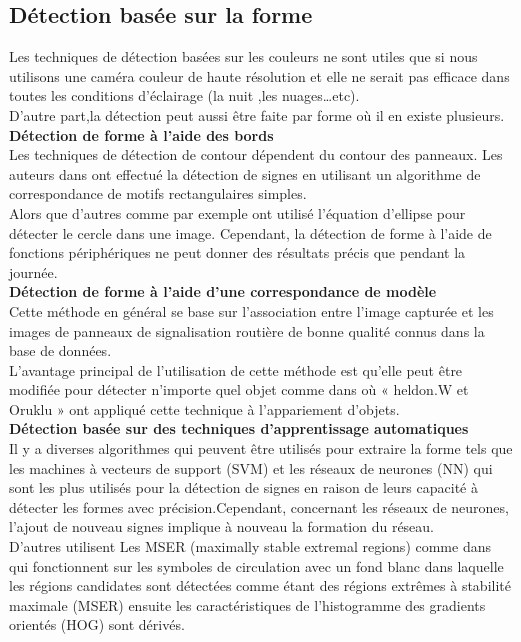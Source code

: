 \subsection{ Détection basée sur la forme}

Les techniques de détection basées sur les couleurs ne sont utiles que si nous utilisons une caméra couleur de haute résolution et elle ne serait pas efficace dans toutes les conditions d’éclairage (la nuit ,les nuages…etc).\\
D’autre part,la détection peut aussi être faite par forme où il en existe plusieurs.\\

{\textbf{Détection de forme à l'aide des bords }}\\

Les techniques de détection de contour dépendent du contour des panneaux. Les auteurs dans \cite{19} ont effectué la détection de signes en utilisant un algorithme de correspondance de motifs rectangulaires simples.\\ 
Alors que d’autres comme par exemple \cite{20} ont utilisé l'équation d'ellipse pour détecter le cercle dans une image.
Cependant, la détection de forme à l'aide de fonctions périphériques ne peut donner des résultats précis que pendant la journée.\\

{\textbf{Détection de forme à l'aide d'une correspondance de modèle}}\\

Cette  méthode en général se base sur l’association entre l'image capturée et les  images de panneaux de signalisation routière de bonne qualité connus dans la base de données.\\ 
L’avantage principal de l’utilisation de cette méthode est qu’elle peut être modifiée pour détecter n’importe quel objet comme dans \cite{21} où « heldon.W et Oruklu » ont appliqué cette technique à l'appariement d'objets.\\

{\textbf{Détection basée sur des techniques d'apprentissage automatiques}}\\

Il y a diverses algorithmes qui peuvent être utilisés pour extraire la forme tels que les machines à vecteurs de support (SVM) et les réseaux de neurones (NN) qui sont les plus utilisés pour la détection de signes en raison de leurs capacité à détecter les formes avec précision.Cependant, concernant les réseaux de neurones, l’ajout de nouveau signes implique à nouveau la formation du réseau.\\ 
D’autres utilisent Les MSER (maximally stable extremal regions) comme dans \cite{21} qui fonctionnent sur les symboles de circulation avec un fond blanc dans laquelle les régions candidates sont détectées comme étant des régions extrêmes à stabilité maximale (MSER) ensuite les caractéristiques de l'histogramme des gradients orientés (HOG) sont dérivés.\\

